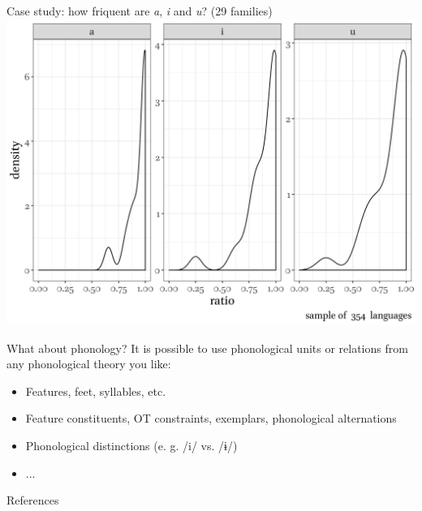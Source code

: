 \documentclass[13pt, t]{beamer}
\begin{document}
\begin{frame}{Case study: how friquent are \textit{a}, \textit{i} and \textit{u}? (29 families)}
\includegraphics[width = \linewidth]{images/08_distributions}
\end{frame}

\begin{frame}{What about phonology?}
It is possible to use phonological units or relations from any phonological theory you like:
\begin{itemize}
\item Features, feet, syllables, etc.
\item Feature constituents, OT constraints, exemplars, phonological alternations
\item Phonological distinctions (e. g. /i/ vs. /ɨ/)
\item ...
\end{itemize}
\end{frame}



\begin{frame}{References}
\footnotesize


\end{frame}
\end{document}
